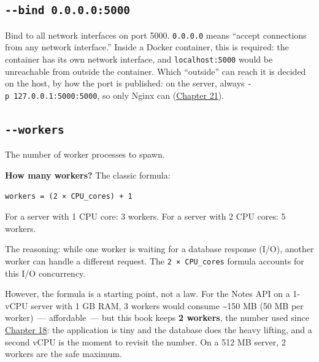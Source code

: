 \subsection*{\texorpdfstring{\texttt{-\/-bind\ 0.0.0.0:5000}}{-\/-bind 0.0.0.0:5000}}\label{24-process-startup:--bind-00005000}

Bind to all network interfaces on port 5000. \texttt{0.0.0.0} means ``accept connections from any network interface.'' Inside a Docker container, this is required: the container has its own network interface, and \texttt{localhost:5000} would be unreachable from outside the container. Which ``outside'' can reach it is decided on the host, by how the port is published: on the server, always \texttt{-p\ 127.0.0.1:5000:5000}, so only Nginx can (\hyperref[ch:21-system-setup]{Chapter 21}).

\subsection*{\texorpdfstring{\texttt{-\/-workers}}{-\/-workers}}\label{24-process-startup:--workers}

The number of worker processes to spawn.

\textbf{How many workers?} The classic formula:

\begin{outputbox}[short]
\begin{Verbatim}[fontsize=\codesize, breaklines, breakanywhere, breaksymbolleft={\tiny\textcolor{muted}{$\hookrightarrow$}}]
workers = (2 × CPU_cores) + 1
\end{Verbatim}
\end{outputbox}

\noindent{}For a server with 1 CPU core: 3 workers.
For a server with 2 CPU cores: 5 workers.

The reasoning: while one worker is waiting for a database response (I/O), another worker can handle a different request. The \texttt{2\ ×\ CPU\_cores} formula accounts for this I/O concurrency.

However, the formula is a starting point, not a law. For the Notes API on a 1-vCPU server with 1 GB RAM, 3 workers would consume \textasciitilde150 MB (50 MB per worker)~--- affordable~--- but this book keeps \textbf{2 workers}, the number used since \hyperref[ch:18-containerization]{Chapter 18}: the application is tiny and the database does the heavy lifting, and a second vCPU is the moment to revisit the number. On a 512 MB server, 2 workers are the safe maximum.

